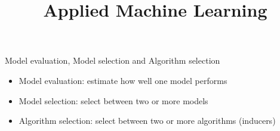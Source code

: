 \documentclass[11pt,compress,t,notes=noshow, aspectratio=169, xcolor=table]{beamer}
\title{Applied Machine Learning}
\date{}
\begin{document}
\newcommand{\titlefigure}{figure/normal_densities}
\newcommand{\learninggoals}{
\item What questions can we answer with benchmarks?
\item What value do hypothesis tests add?
\item Benchmarking scenarios and relevant tests}


\begin{frame}{Model evaluation, Model selection and Algorithm selection}
\vfill
\begin{itemize}
    \item Model evaluation: estimate how well one model performs
    \item Model selection: select between two or more models
    \item Algorithm selection: select between two or more algorithms (inducers)
\end{itemize}
\vfill    
\end{frame}


\end{document}
